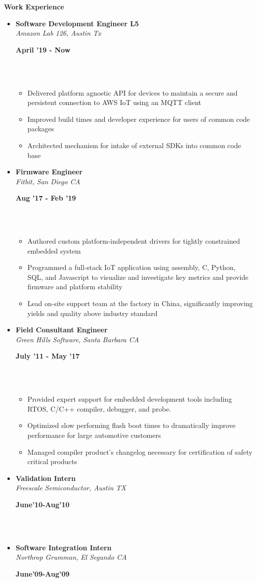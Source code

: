 \documentclass[a4paper,11pt]{article}
\newcommand{\isep}{0 pt}
\newcommand{\resheading}[1]{{\small \colorbox{mygrey}{\begin{minipage}{0.975\textwidth}{\textbf{#1 \vphantom{p\^{E}}}}\end{minipage}}}}
\newcommand{\workexp}[4]{
\begin{minipage}[t]{7cm}
\begin{flushleft}
\textbf{#1} \\
\indent \emph{#2}\\
\end{flushleft}
\end{minipage}
\hfill
\begin{minipage}[t]{7cm}
\begin{flushright}
\textbf{#3} \\
\indent #4 \\
\end{flushright}
\end{minipage}
\\[-0.10in]
}
\begin{document}
\resheading{\textbf{Work Experience}}
\begin{itemize}
\item
\workexp{Software Development Engineer L5}{Amazon Lab 126, Austin Tx}{April '19 - Now}{}
    \begin{itemize}\itemsep \isep
        \item Delivered platform agnostic API for devices to maintain a secure and persistent connection to AWS IoT using an MQTT client
        \item Improved build times and developer experience for users of common code packages 
        \item Architected mechanism for intake of external SDKs into common code base
    \end{itemize}

\item
\workexp{Firmware Engineer}{Fitbit, San Diego CA}{Aug '17 - Feb '19}{}
    \begin{itemize}\itemsep \isep
        \item Authored custom platform-independent drivers for tightly constrained embedded system
        \item Programmed a full-stack IoT application using assembly, C, Python, SQL, and Javascript to visualize and investigate key metrics and provide firmware and platform stability
        \item Lead on-site support team at the factory in China, significantly improving yields and quality above industry standard
    \end{itemize}

\item
\workexp{Field Consultant Engineer}{Green Hills Software, Santa Barbara CA}{July '11 - May '17}{}
	\begin{itemize}\itemsep \isep
        \item Provided expert support for embedded development tools including RTOS, C/C++ compiler, debugger, and probe.
        \item Optimized slow performing flash boot times to dramatically improve performance for large automotive customers
        \item Managed compiler product's changelog necessary for certification of safety critical products
	\end{itemize}

\item
\workexp{Validation Intern}{Freescale Semiconductor, Austin TX}{June'10-Aug'10}{}

\item
\workexp{Software Integration Intern}{Northrop Grumman, El Segundo CA}{June'09-Aug'09}{}

\end{itemize}
\end{document}
